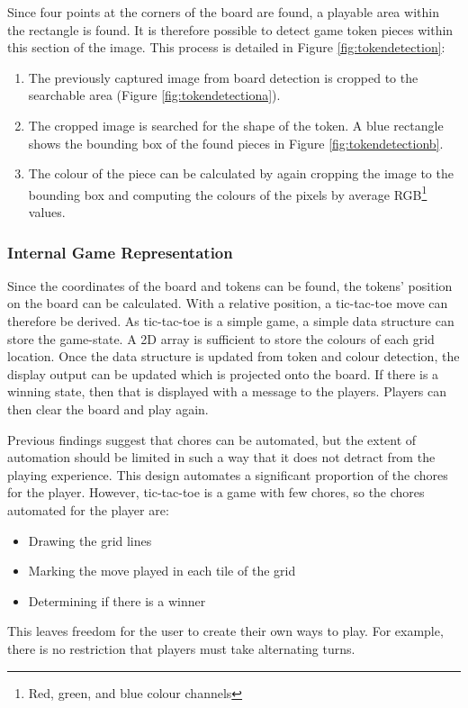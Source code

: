 \documentclass[12pt]{article}
\begin{document}
Since four points at the corners of the board are found, a playable area within the rectangle is found. 
It is therefore possible to detect game token pieces within this section of the image. This process is detailed in Figure \ref{fig:tokendetection}:

\begin{enumerate}
    \item The previously captured image from board detection is cropped to the searchable area (Figure \ref{fig:tokendetectiona}).
    \item The cropped image is searched for the shape of the token. A blue rectangle shows the bounding box of the found pieces in Figure \ref{fig:tokendetectionb}.
    \item The colour of the piece can be calculated by again cropping the image to the bounding box and computing the colours of the pixels by average RGB\footnote{Red, green, and blue colour channels} values.
\end{enumerate}

\subsubsection{Internal Game Representation}
Since the coordinates of the board and tokens can be found, the tokens' position on the board can be calculated. 
With a relative position, a tic-tac-toe move can therefore be derived. 
As tic-tac-toe is a simple game, a simple data structure can store the game-state. 
A 2D array is sufficient to store the colours of each grid location. 
Once the data structure is updated from token and colour detection, the display output can be updated which is projected onto the board. 
If there is a winning state, then that is displayed with a message to the players. 
Players can then clear the board and play again. 

Previous findings suggest that chores can be automated, but the extent of automation should be limited in such a way that it does not detract from the playing experience.
This design automates a significant proportion of the chores for the player. 
However, tic-tac-toe is a game with few chores, so the chores automated for the player are:
\begin{itemize}
    \item Drawing the grid lines
    \item Marking the move played in each tile of the grid
    \item Determining if there is a winner
\end{itemize}
This leaves freedom for the user to create their own ways to play. 
For example, there is no restriction that players must take alternating turns. 
\end{document}
